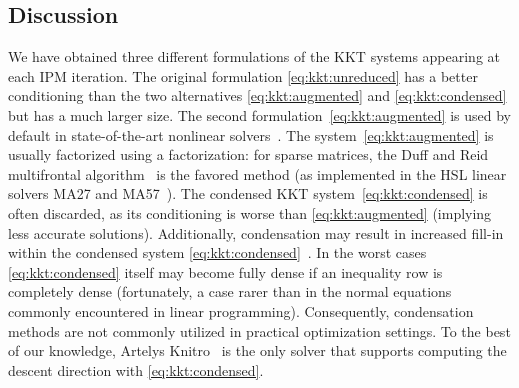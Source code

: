 \subsection{Discussion}

We have obtained three different formulations of the KKT systems
appearing at each IPM iteration.  The original formulation
\eqref{eq:kkt:unreduced} has a better
conditioning than the two alternatives \eqref{eq:kkt:augmented} and
\eqref{eq:kkt:condensed} but has a much larger size.
The second formulation~\eqref{eq:kkt:augmented} is
used by default in state-of-the-art nonlinear solvers~\cite{wachter2006implementation,waltz2006interior}.
The system~\eqref{eq:kkt:augmented} is usually factorized using a \lblt factorization: for sparse matrices, the Duff and Reid
multifrontal algorithm~\cite{duff1983multifrontal} is the favored method (as implemented in the HSL linear solvers MA27 and MA57~\cite{duff2004ma57}).
The condensed KKT system~\eqref{eq:kkt:condensed} is often discarded,
as its conditioning is worse
than \eqref{eq:kkt:augmented} (implying less accurate solutions).
Additionally, condensation may result in increased fill-in within the condensed system \eqref{eq:kkt:condensed}~\cite[Section 19.3, p.571]{nocedal_numerical_2006}.
In the worst cases \eqref{eq:kkt:condensed} itself may become fully dense if an inequality row is completely dense (fortunately, a case rarer than in the normal equations commonly encountered in linear programming).
Consequently, condensation methods are not commonly utilized in practical optimization settings.
To the best of our knowledge, Artelys Knitro~\cite{waltz2006interior} is the only solver that supports computing the descent direction with \eqref{eq:kkt:condensed}.

